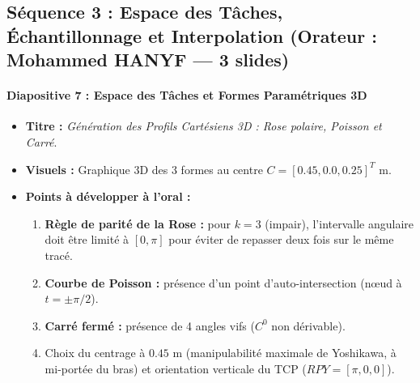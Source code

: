 \documentclass[11pt,a4paper]{report}
\begin{document}
\subsection{Séquence 3 : Espace des Tâches, Échantillonnage et Interpolation (Orateur : Mohammed HANYF — 3 slides)}

\paragraph{Diapositive 7 : Espace des Tâches et Formes Paramétriques 3D}
\begin{itemize}
    \item \textbf{Titre :} \textit{Génération des Profils Cartésiens 3D : Rose polaire, Poisson et Carré}.
    \item \textbf{Visuels :} Graphique 3D des 3 formes au centre $C = [0.45, 0.0, 0.25]^T\text{ m}$.
    \item \textbf{Points à développer à l'oral :}
    \begin{enumerate}
        \item \textbf{Règle de parité de la Rose :} pour $k=3$ (impair), l'intervalle angulaire doit être limité à $[0, \pi]$ pour éviter de repasser deux fois sur le même tracé.
        \item \textbf{Courbe de Poisson :} présence d'un point d'auto-intersection (nœud à $t = \pm \pi/2$).
        \item \textbf{Carré fermé :} présence de 4 angles vifs ($C^0$ non dérivable).
        \item Choix du centrage à $0.45\text{ m}$ (manipulabilité maximale de Yoshikawa, à mi-portée du bras) et orientation verticale du TCP ($RPY = [\pi, 0, 0]$).
    \end{enumerate}
\end{itemize}
\end{document}
